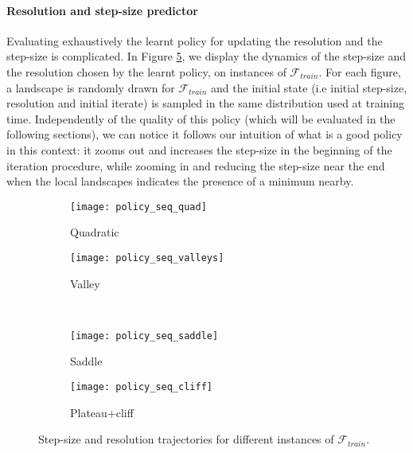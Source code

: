 {		\paragraph{Resolution and step-size predictor} Evaluating exhaustively the learnt policy for updating the resolution and the step-size is complicated. In Figure \ref{fig::policy_seq}, we display the dynamics of the step-size and the resolution chosen by the learnt policy, on instances of $\mathcal{F}_{train}$. For each figure, a landscape is randomly drawn for $\mathcal{F}_{train}$ and the initial state (i.e initial step-size, resolution and initial iterate) is sampled in the same distribution used at training time. Independently of the quality of this policy (which will be evaluated in the following sections), we can notice it follows our intuition of what is a good policy in this context: it zooms out  and increases the step-size in the beginning of the iteration procedure, while zooming in and reducing the step-size near the end when the local landscapes indicates the presence of a minimum nearby. 
		
		\begin{figure}[h!]
			\centering
			\begin{subfigure}[b]{0.45\linewidth}
			{
				\centering
				\texttt{[image: policy\_seq\_quad]}
				\caption{Quadratic}
				\label{fig::policy_seq_quadratic}
			}
			\end{subfigure}
			\begin{subfigure}[b]{0.45\linewidth}
			{
				\centering
				\texttt{[image: policy\_seq\_valleys]}
				\caption{Valley}
				\label{fig::policy_seq_valley}
			}
			\end{subfigure}\\
			\begin{subfigure}[b]{0.45\linewidth}
			{
				\centering
				\texttt{[image: policy\_seq\_saddle]}
				\caption{Saddle}
				\label{fig::policy_seq_saddle}
			}
			\end{subfigure}
			\begin{subfigure}[b]{0.45\linewidth}
			{
				\centering
				\texttt{[image: policy\_seq\_cliff]}
				\caption{Plateau+cliff}
				\label{fig::policy_seq_cliff}
			}
			\end{subfigure}
			\caption{Step-size and resolution trajectories for different instances of $\mathcal{F}_{train}$.}
			\label{fig::policy_seq}
		\end{figure}
		
}
